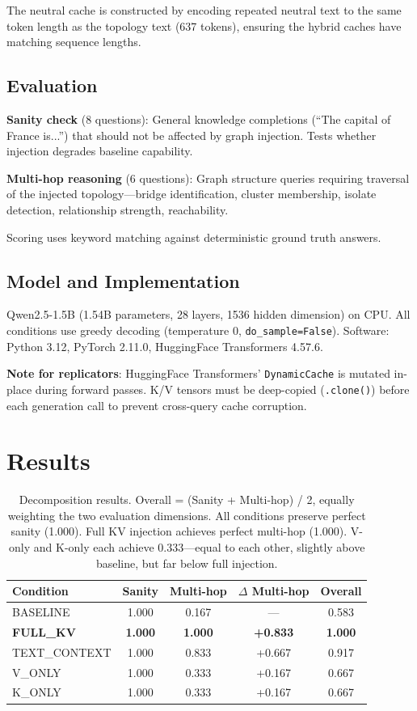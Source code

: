 \documentclass[11pt,a4paper]{article}
\begin{document}
The neutral cache is constructed by encoding repeated neutral text to the same token length as the topology text (637 tokens), ensuring the hybrid caches have matching sequence lengths.

\subsection{Evaluation}

\textbf{Sanity check} (8 questions): General knowledge completions (``The capital of France is...'') that should not be affected by graph injection. Tests whether injection degrades baseline capability.

\textbf{Multi-hop reasoning} (6 questions): Graph structure queries requiring traversal of the injected topology---bridge identification, cluster membership, isolate detection, relationship strength, reachability.

Scoring uses keyword matching against deterministic ground truth answers.

\subsection{Model and Implementation}

Qwen2.5-1.5B (1.54B parameters, 28 layers, 1536 hidden dimension) on CPU. All conditions use greedy decoding (temperature 0, \texttt{do\_sample=False}). Software: Python 3.12, PyTorch 2.11.0, HuggingFace Transformers 4.57.6.

\textbf{Note for replicators}: HuggingFace Transformers' \texttt{DynamicCache} is mutated in-place during forward passes. K/V tensors must be deep-copied (\texttt{.clone()}) before each generation call to prevent cross-query cache corruption.

\section{Results}

\begin{table}[h]
\centering
\begin{tabular}{lcccc}
\toprule
\textbf{Condition} & \textbf{Sanity} & \textbf{Multi-hop} & \textbf{$\Delta$ Multi-hop} & \textbf{Overall} \\
\midrule
BASELINE & 1.000 & 0.167 & --- & 0.583 \\
\textbf{FULL\_KV} & \textbf{1.000} & \textbf{1.000} & \textbf{+0.833} & \textbf{1.000} \\
TEXT\_CONTEXT & 1.000 & 0.833 & +0.667 & 0.917 \\
V\_ONLY & 1.000 & 0.333 & +0.167 & 0.667 \\
K\_ONLY & 1.000 & 0.333 & +0.167 & 0.667 \\
\bottomrule
\end{tabular}
\caption{Decomposition results. Overall = (Sanity + Multi-hop) / 2, equally weighting the two evaluation dimensions. All conditions preserve perfect sanity (1.000). Full KV injection achieves perfect multi-hop (1.000). V-only and K-only each achieve 0.333---equal to each other, slightly above baseline, but far below full injection.}
\label{tab:results}
\end{table}
\end{document}
